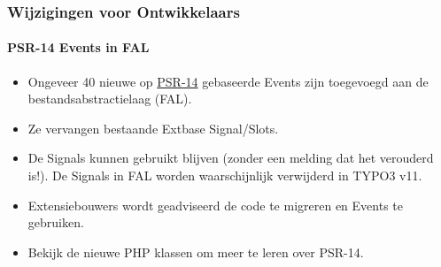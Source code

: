 
\begin{frame}[fragile]
	\frametitle{Wijzigingen voor Ontwikkelaars}
	\framesubtitle{PSR-14 Events in FAL}

	\lstset{basicstyle=\tiny\ttfamily}

	\begin{itemize}
		\item Ongeveer 40 nieuwe op
			\href{https://www.php-fig.org/psr/psr-14/}{PSR-14}
			gebaseerde Events zijn toegevoegd aan de bestandsabstractielaag (FAL).
		\item Ze vervangen bestaande Extbase Signal/Slots.
		\item De Signals kunnen gebruikt blijven (zonder een melding dat het verouderd is!).
			De Signals in FAL worden waarschijnlijk verwijderd in TYPO3 v11.
		\item Extensiebouwers wordt geadviseerd de code te migreren en Events te gebruiken.
		\item Bekijk de nieuwe PHP klassen om meer te leren over PSR-14.
	\end{itemize}

\end{frame}



